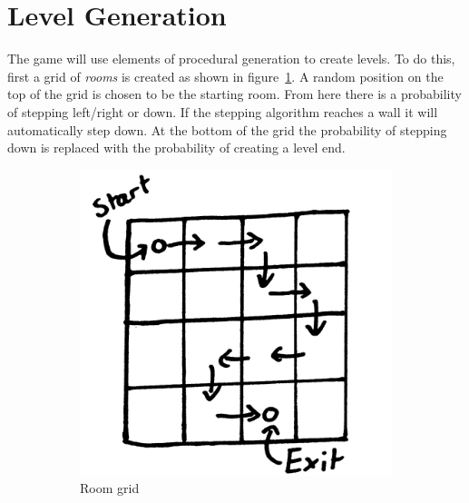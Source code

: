 
\section{Level Generation}

The game will use elements of procedural generation to create levels. To do this, first a grid of \textit{rooms} is created as shown in figure~\ref{fig:sub1:level}. A random position on the top of the grid is chosen to be the starting room. From here there is a probability of stepping left/right or down. If the stepping algorithm reaches a wall it will automatically step down. At the bottom of the grid the probability of stepping down is replaced with the probability of creating a level end.

\begin{figure}[ht]
\centering
\begin{subfigure}{.5\textwidth}
  \centering
  \includegraphics[scale=0.2, trim = 0cm 0cm 0cm 2cm]{images/4x4}
  \caption{Room grid}
  \label{fig:sub1:level}
\end{subfigure}%
\begin{subfigure}{.5\textwidth}
  \centering

\end{subfigure}
\end{figure}

